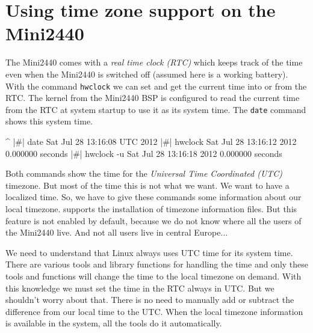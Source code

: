 %
%
%
%
%
%
%
\section{Using time zone support on the Mini2440}	\label{sec:timezone}

The Mini2440 comes with a \textit{real time clock (RTC)} which keeps track of
the time even when the Mini2440 is switched off (assumed here is a working
battery). With the command \texttt{hwclock} we can set and get the current
time into or from the RTC. The kernel from the Mini2440 BSP is configured to
read the current time from the RTC at system startup to use it as its system
time. The \texttt{date} command shows this system time.

\begin{ptxshell}[escapechar=|]{^}
|\#| date
Sat Jul 28 13:16:08 UTC 2012
|\#| hwclock
Sat Jul 28 13:16:12 2012  0.000000 seconds
|\#| hwclock -u
Sat Jul 28 13:16:18 2012  0.000000 seconds
\end{ptxshell}

Both commands show the time for the \textit{Universal Time Coordinated (UTC)}
timezone. But most of the time this is not what we want. We want to have a
localized time. So, we have to give these commands some information about our
local timezone. \ptxdist{} supports the installation of timezone information
files. But this feature is not enabled by default, because we do not know where
all the users of the Mini2440 live. And not all users live in central
Europe...

We need to understand that Linux always uses UTC time for its system time.
There are various tools and library functions for handling
the time and only these tools and functions will change the time to the local
timezone on demand.
With this knowledge we must set the time in the RTC always in UTC. But we
shouldn't worry about that. There is no need to manually add or subtract the
difference from our local time to the UTC. When the local timezone information
is available in the system, all the tools do it automatically.

